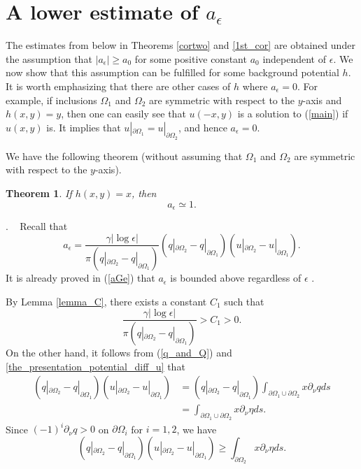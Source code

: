 \documentclass[11pt,a4paper]{article}
\numberwithin{equation}{section}
\newtheorem{thm}{Theorem}[section]
\newcommand{\pf}{\noindent {\sl Proof}. \ }
\newcommand{\p}{\partial}
\newcommand{\eqnref}[1]{(\ref {#1})}
\newcommand{\Ge}{\epsilon}
\newcommand{\Gg}{\gamma}
\newcommand{\Gn}{\eta}
\newcommand{\GO}{\Omega}
\newcommand{\beq}{\begin{equation}}
\newcommand{\eeq}{\end{equation}}
\begin{document}
\section{A lower estimate of $a_\Ge$}\label{sec:aGe}

The estimates from below in Theorems \ref{cortwo} and \ref{1st_cor} are obtained under the assumption that $|a_\Ge| \ge a_0$ for some positive constant $a_0$ independent of $\Ge$. We now show that this assumption can be fulfilled for some background potential $h$. It is worth emphasizing that there are other cases of $h$ where $a_\Ge=0$. For example, if inclusions $\GO_1$ and $\GO_2$ are symmetric with respect to the $y$-axis and $h(x,y)=y$, then one can easily see that $u(-x,y)$ is a solution to \eqnref{main} if $u(x,y)$ is. It implies that $u|_{\p\GO_1}=u|_{\p\GO_2}$, and hence $a_\Ge=0$.


We have the following theorem (without assuming that $\GO_1$ and $\GO_2$ are symmetric with respect to the $y$-axis).

\begin{thm}\label{2nd_thm}
If $h(x,y) = x$, then
\beq
a_{\Ge} \simeq 1.
\eeq
\end{thm}

\pf
Recall that
$$
a_{\Ge} = \frac{\Gg |\log\Ge|}{\pi (q |_{\p\GO_2} - q|_{\p\GO_1})} (q |_{\p \GO_2} - q|_{\p \GO_1})(u |_{\p \GO_2} - u|_{\p \GO_1})  .
$$
It is already proved in \eqnref{aGe} that $a_\Ge$ is bounded above regardless of $\Ge$ .

By Lemma \ref{lemma_C}, there exists a constant $C_1$ such that
\beq\label{aGelower}
\frac{\Gg |\log\Ge|}{\pi (q |_{\p\GO_2} - q|_{\p\GO_1})} > C_1 >0.
\eeq
On the other hand, it follows from \eqnref{q_and_Q} and \eqref{the_presentation_potential_diff_u} that
\begin{align*}
(q |_{\p \GO_2} - q|_{\p \GO_1})(u |_{\p \GO_2} - u|_{\p \GO_1}) &= (q |_{\p \GO_2} - q|_{\p \GO_1}) \int_{\p \GO_1 \cup \p \GO_2} x \p_{\nu} q ds \\
&= \int_{\p \GO_1 \cup \p \GO_2} x \p_{\nu} \Gn ds.
\end{align*}
Since $(-1)^{i} \p_{\nu} q > 0 $ on $\p \GO_i$ for $i=1,2$, we have
$$
(q |_{\p \GO_2} - q|_{\p \GO_1})(u |_{\p \GO_2} - u|_{\p \GO_1}) \ge \int_{\p\GO_2} x \p_{\nu} \Gn ds.
$$
\end{document}

